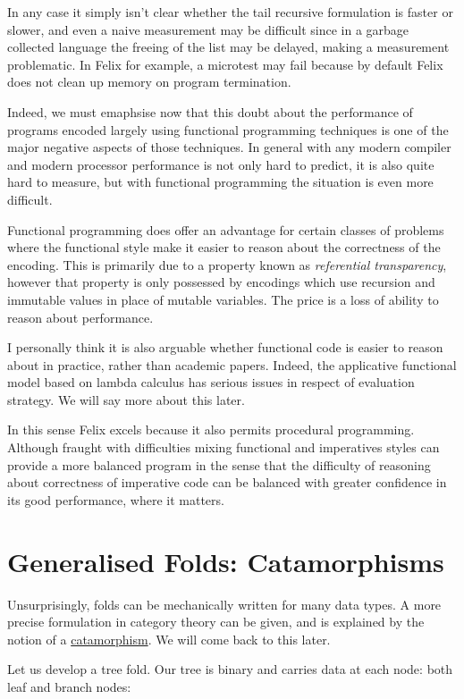 \documentclass[oneside]{book}
\begin{document}
In any case it simply isn't clear whether the tail recursive
formulation is faster or slower, and even a naive measurement
may be difficult since in a garbage collected language the
freeing of the list may be delayed, making a measurement 
problematic. In Felix for example, a microtest may fail
because by default Felix does not clean up memory on 
program termination.

Indeed, we must emaphsise now that this doubt about
the performance of programs encoded largely using
functional programming techniques is one of the major
negative aspects of those techniques. In general with
any modern compiler and modern processor performance
is not only hard to predict, it is also quite hard to
measure, but with functional programming the situation
is even more difficult.

Functional programming does offer an advantage for certain
classes of problems where the functional style make it
easier to reason about the correctness of the encoding.
This is primarily due to a property known as 
{\em referential transparency}, however that property is only
possessed by encodings which use recursion and immutable
values in place of mutable variables. The price is a loss
of ability to reason about performance.

I personally think it is also arguable whether functional
code is easier to reason about in practice, rather than
academic papers. Indeed, the applicative functional model based on
lambda calculus has serious issues in respect of evaluation
strategy. We will say more about this later.

In this sense Felix excels because it also permits
procedural programming. Although fraught with difficulties
mixing functional and imperatives styles can provide
a more balanced program in the sense that the difficulty
of reasoning about correctness of imperative code
can be balanced with greater confidence in its good
performance, where it matters.


\section{Generalised Folds: Catamorphisms}
Unsurprisingly, folds can be mechanically written
for many data types. A more precise formulation in
category theory can be given, and is explained by
the notion of a
\href{https://en.wikipedia.org/wiki/Catamorphism}{catamorphism}.
We will come back to this later.

Let us develop a tree fold. Our tree is binary and carries
data at each node: both leaf and branch nodes:
\end{document}
